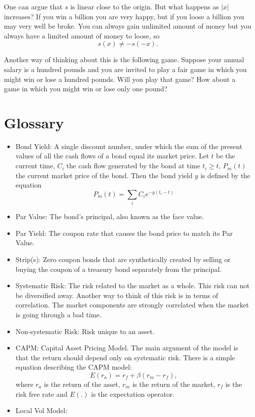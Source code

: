 \documentclass{amsart}
\theoremstyle{plain}
\numberwithin{equation}{section}
\begin{document}
One can argue that $s$ is linear close to the 
origin. But what happens as $|x|$ increases?
If you win a billion you are very happy, but if you 
loose a billion you may very well be broke. You can 
always gain unlimited amount of money but you always 
have a limited amount of money to loose, so 
\begin{equation}
s(x) \neq -s(-x).
\end{equation}

Another way of thinking about this is the following 
game. Suppose your annual salary is a hundred pounds
and you are invited to play a fair game in which you 
might win or lose a hundred pounds. Will you play that 
game? How about a game in which you might win or lose 
only one pound?

\section{Glossary}
\begin{itemize}
	\item Bond Yield: A single discount number, under which
	the sum of the present values of all the cash flows of a bond equal 
	its market price. Let $t$ be the current time, $C_i$ the cash flow generated by the bond at
	time $t_i \geq t$, $P_m(t)$ the current market price of the bond. Then the bond yield
	$y$ is defined by the equation
	\begin{equation}
	P_m(t) = \sum_{i} C_i e^{- y (t_i - t )}
	\label{eq:bond_yield}
	\end{equation}
	\item Par Value: The bond's principal, also known as the face value. 
	\item Par Yield: The coupon rate that causes the bond price to match 
	its Par Value.
	\item Strip(s): Zero coupon bonds that are synthetically created by 
	selling or buying the coupon of a treasury bond separately from the principal.
	\item Systematic Risk: The risk related to the market as a whole. This 
	risk can not be diversified away. Another way to think of this risk 
	is in terms of correlation. The market components are strongly correlated
	when the market is going through a bad time.
	\item Non-systematic Risk: Risk unique to an asset.
	\item CAPM: Capital Asset Pricing Model. The main argument of the model is that 
	the return should depend only on systematic risk. There is a simple 
	equation describing the CAPM model:
	\begin{equation}
	E(r_a) = r_f + \beta( r_m - r_f ),
	\label{eq:capm}
	\end{equation}
	where $r_a$ is the return of the asset,
	$r_m$ is the return of the market, 
	$r_f$ is the risk free rate and $E(.)$ is 
	the expectation operator. 
	
	\item Local Vol Model: 
	
	
\end{itemize}
\end{document}
